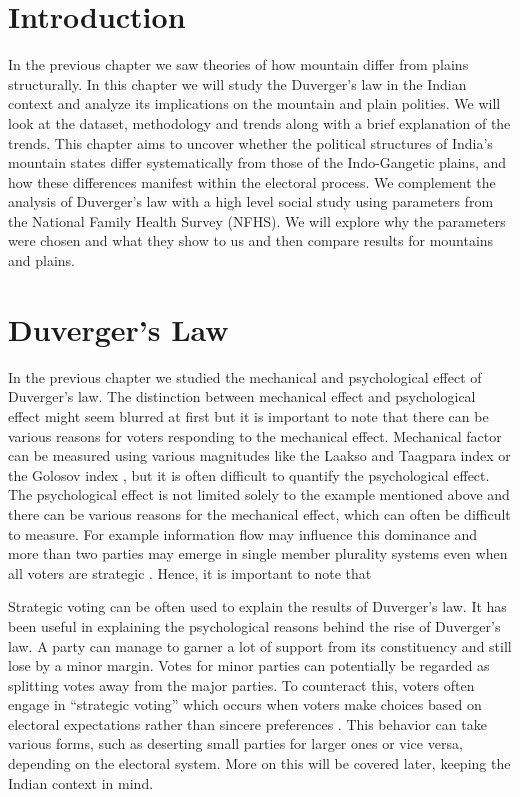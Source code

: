 \section{Introduction}
In the previous chapter we saw theories of how mountain differ from plains structurally. In this chapter we will study the Duverger's law in the Indian context and analyze its implications on the mountain and plain polities.  We will look at the dataset, methodology and trends along with a brief explanation of the trends. This chapter aims to uncover whether the political structures of India's mountain states differ systematically from those of the Indo-Gangetic plains, and how these differences manifest within the electoral process.  We complement the analysis of Duverger's law with a high level social study using parameters from the National Family Health Survey (NFHS). We will explore why the parameters were chosen and what they show to us and then compare results for mountains and plains.
\section{Duverger's Law}

In the previous chapter we studied the mechanical and psychological effect of Duverger’s law. The distinction between mechanical effect and psychological effect might seem blurred at first but it is important to note that there can be various reasons for voters responding to the mechanical effect. Mechanical factor can be measured using various magnitudes like the Laakso and Taagpara index \citep{laakso1979effective} or the Golosov index \citep{golosov2010effective}, but it is often difficult to quantify the psychological effect. The psychological effect is not limited solely to the example mentioned above and there can be various reasons for the mechanical effect, which can often be difficult to measure. For example information flow may influence this dominance and more than two parties may emerge in single member plurality systems even when all voters are strategic \citep{clough2007strategic}. Hence, it is important to note that 

\vspace{0.3cm}

Strategic voting can be often used to explain the results of Duverger's law. It has been useful in explaining the psychological reasons behind the rise of Duverger's law. A party can manage to garner a lot of support from its constituency and still lose by a minor margin. Votes for minor parties can potentially be regarded as splitting votes away from the major parties. To counteract this, voters often engage in \enquote{strategic voting}  which occurs when voters make choices based on electoral expectations rather than sincere preferences \citep{Bol2019StrategicVV}. This behavior can take various forms, such as deserting small parties for larger ones or vice versa, depending on the electoral system. More on this will be covered later, keeping the Indian context in mind. 
 
